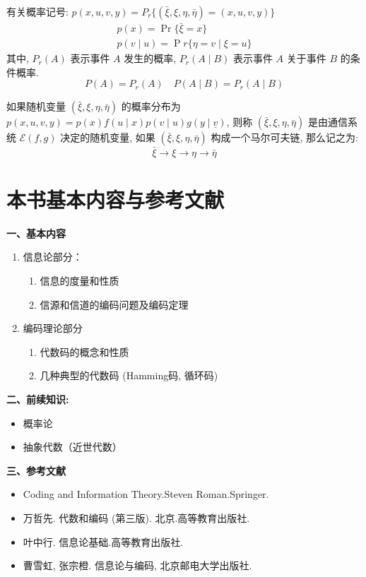 有关概率记号: $ p(x, u, v, y)=P_{r}\{(\bar{\xi}, \xi, \eta, \bar{\eta})=(x, u, v, y)\} $
$$
\begin{array}{l}
p(x)=\operatorname{Pr}\{\bar{\xi}=x\} \\
p(v \mid u)=\operatorname{P} r\{\eta=v \mid \xi=u\}
\end{array}
$$
其中, $ P_{r}(A) $ 表示事件 $ A $ 发生的概率, $ P_{r}(A \mid B) $ 表示事件 $ A $ 关于事件 $ B $ 的条件概率.
$$
P(A)=P_{r}(A) \quad P(A \mid B)=P_{r}(A \mid B)
$$

\begin{definition}
    如果随机变量 $ (\bar{\xi}, \xi, \eta, \bar{\eta}) $ 的概率分布为 $ p(x, u, v, y)=p(x) f(u \mid x) p(v \mid u) g(y \mid \underline{v}) $, 则称 $ (\bar{\xi}, \xi, \eta, \bar{\eta}) $ 是由通信系统 $ \mathscr{E}(f, g) $ 决定的随机变量, 如果 $ (\bar{\xi}, \xi, \eta, \bar{\eta}) $ 构成一个马尔可夫链, 那么记之为:
$$
\bar{\xi} \longrightarrow \xi \longrightarrow \eta \longrightarrow \bar{\eta}
$$
\end{definition}

\section{本书基本内容与参考文献}

\textbf{一、基本内容}
\begin{enumerate}
    \item 信息论部分：
    \begin{enumerate}
        \item 信息的度量和性质
        \item 信源和信道的编码问题及编码定理
    \end{enumerate}
    \item 编码理论部分
\begin{enumerate}
    \item 代数码的概念和性质
    \item 几种典型的代数码 (Hamming码, 循环码)
\end{enumerate}
\end{enumerate}
\textbf{二、前续知识:}
\begin{itemize}
    \item 概率论
    \item 抽象代数（近世代数）
\end{itemize}
\textbf{三、参考文献}

\begin{itemize}
    \item Coding and Information Theory.Steven Roman.Springer.
    \item 万哲先. 代数和编码 (第三版). 北京.高等教育出版社.
    \item 叶中行. 信息论基础.高等教育出版社.
    \item 曹雪虹, 张宗橙. 信息论与编码, 北京邮电大学出版社.
\end{itemize}


